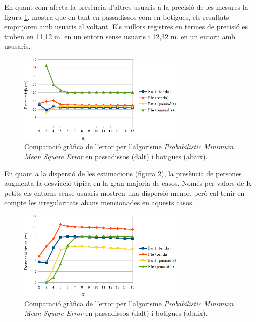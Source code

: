 En quant com afecta la presència d'altres usuaris a la precisió de les mesures la figura \ref{fig:grafic_mitja_MMSE}, mostra que en tant en passadissos com en botigues, els resultats empitjoren amb usuaris al voltant. Els millors registres en termes de precisió es troben en 11,12 m. en un entorn sense usuaris i 12,32 m. en un entorn amb ususaris.

\begin{figure}[ht]
\begin{center}
\includegraphics[width=8cm]{imatges/mmse_mitja.png}
\caption{Comparació gràfica de l'error per l'algorisme \textit{Probabilistic Minimum Mean Square Error} en passadissos (dalt) i botigues (abaix).}
\label{fig:grafic_mitja_MMSE}
\end{center}
\end{figure}

En quant a la dispersió de les estimacions (figura \ref{fig:grafic_desviacio_MMSE}), la presència de persones augmenta la desviació típica en la gran majoria de casos. Només per valors de K petits els entorns sense usuaris mostren una dispersió menor, però cal tenir en compte les irregularitats abans mencionades en aquests casos. 

\begin{figure}[ht]
\begin{center}
\includegraphics[width=8cm]{imatges/mmse_desviacio.png}
\caption{Comparació gràfica de l'error per l'algorisme \textit{Probabilistic Minimum Mean Square Error} en passadissos (dalt) i botigues (abaix).}
\label{fig:grafic_desviacio_MMSE}
\end{center}
\end{figure}
